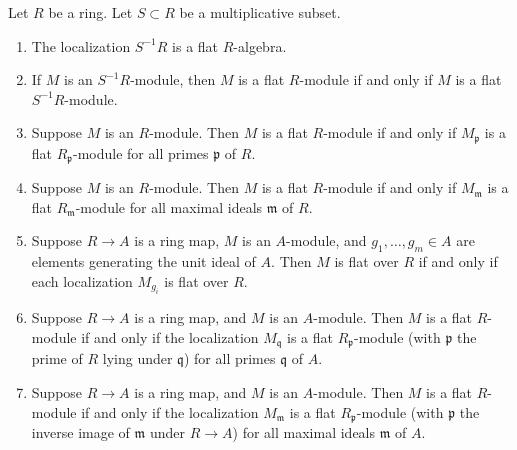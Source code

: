 \begin{lemma}
\label{editorial-source-lemma-flat-localization}
Let $R$ be a ring. Let $S \subset R$ be a multiplicative subset.
\begin{enumerate}
\item The localization $S^{-1}R$ is a flat $R$-algebra.
\item If $M$ is an $S^{-1}R$-module, then $M$ is a flat $R$-module
if and only if $M$ is a flat $S^{-1}R$-module.
\item Suppose $M$ is an $R$-module. Then
$M$ is a flat $R$-module if and only if $M_{\mathfrak p}$ is a flat
$R_{\mathfrak p}$-module for all primes $\mathfrak p$ of $R$.
\item Suppose $M$ is an $R$-module. Then $M$ is a flat $R$-module if
and only if $M_{\mathfrak m}$ is a flat
$R_{\mathfrak m}$-module for all maximal ideals $\mathfrak m$ of $R$.
\item Suppose $R \to A$ is a ring map, $M$ is an $A$-module,
and $g_1, \ldots, g_m \in A$ are elements generating the unit
ideal of $A$. Then $M$ is flat over $R$ if and only if each localization
$M_{g_i}$ is flat over $R$.
\item Suppose $R \to A$ is a ring map, and $M$ is an $A$-module.
Then $M$ is a flat $R$-module if and only if the localization
$M_{\mathfrak q}$ is a flat $R_{\mathfrak p}$-module
(with $\mathfrak p$ the prime of $R$ lying under $\mathfrak q$)
for all primes $\mathfrak q$ of $A$.
\item Suppose $R \to A$ is a ring map, and $M$ is an $A$-module.
Then $M$ is a flat $R$-module if and only if the localization
$M_{\mathfrak m}$ is a flat $R_{\mathfrak p}$-module
(with $\mathfrak p$ the inverse image of $\mathfrak m$ under $R\to A$)
for all maximal ideals $\mathfrak m$ of $A$.
\end{enumerate}
\end{lemma}

